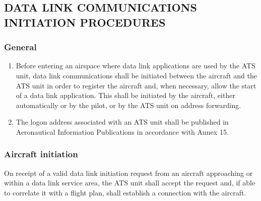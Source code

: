 \documentclass[../main.tex]{subfiles}
\begin{document}
    \subsection[Data link communications initiation procedures]{DATA LINK COMMUNICATIONS INITIATION PROCEDURES}

    \subsubsection{General}

    \begin{enumempty}[labelindent=\parindent]
        \item {}
        \item {}
    \end{enumempty}

    \begin{enumerate}        
        \item Before entering an airspace where data link applications are used by the ATS unit, data link communications shall be initiated between the aircraft and the ATS unit in order to register the aircraft and, when necessary, allow the start of a data link application. This shall be initiated by the aircraft, either automatically or by the pilot, or by the ATS unit on address forwarding.
        \item The logon address associated with an ATS unit shall be published in Aeronautical Information Publications in accordance with Annex 15.

    \end{enumerate}

    \subsubsection{Aircraft initiation}

    On receipt of a valid data link initiation request from an aircraft approaching or within a data link service area, the ATS unit shall accept the request and, if able to correlate it with a flight plan, shall establish a connection with the aircraft.
\end{document}
